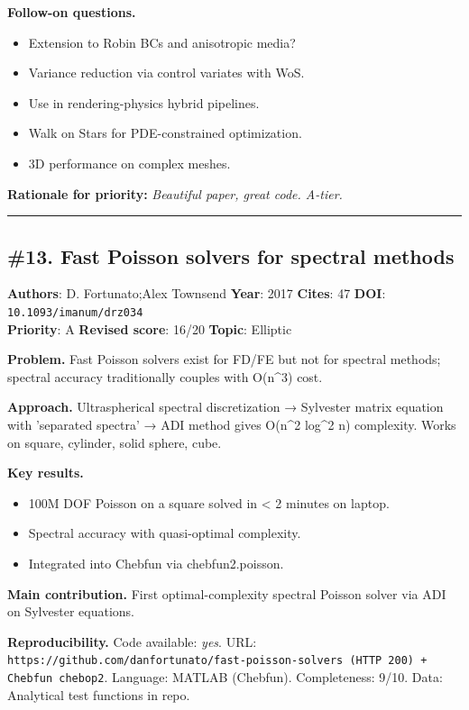 \documentclass[10pt,letterpaper]{article}
\begin{document}
\textbf{Follow-on questions.}
\begin{itemize}
\item Extension to Robin BCs and anisotropic media?
\item Variance reduction via control variates with WoS.
\item Use in rendering-physics hybrid pipelines.
\item Walk on Stars for PDE-constrained optimization.
\item 3D performance on complex meshes.
\end{itemize}

\textbf{Rationale for priority:} \emph{Beautiful paper, great code. A-tier.}

\medskip\hrule\medskip

\subsection*{\#13. Fast Poisson solvers for spectral methods}
\textbf{Authors}: D. Fortunato;Alex Townsend \textbullet{} \textbf{Year}: 2017 \textbullet{} \textbf{Cites}: 47 \textbullet{} \textbf{DOI}: \texttt{10.1093/imanum/drz034} \\
\textbf{Priority}: A \textbullet{} \textbf{Revised score}: 16/20 \textbullet{} \textbf{Topic}: Elliptic

\textbf{Problem.} Fast Poisson solvers exist for FD/FE but not for spectral methods; spectral accuracy traditionally couples with O(n\^{}3) cost.

\textbf{Approach.} Ultraspherical spectral discretization → Sylvester matrix equation with 'separated spectra' → ADI method gives O(n\^{}2 log\^{}2 n) complexity. Works on square, cylinder, solid sphere, cube.

\textbf{Key results.}
\begin{itemize}
\item 100M DOF Poisson on a square solved in < 2 minutes on laptop.
\item Spectral accuracy with quasi-optimal complexity.
\item Integrated into Chebfun via chebfun2.poisson.
\end{itemize}

\textbf{Main contribution.} First optimal-complexity spectral Poisson solver via ADI on Sylvester equations.

\textbf{Reproducibility.} Code available: \emph{yes}. URL: \texttt{https://github.com/danfortunato/fast-poisson-solvers (HTTP 200) + Chebfun chebop2}. Language: MATLAB (Chebfun). Completeness: 9/10. Data: Analytical test functions in repo.
\end{document}
